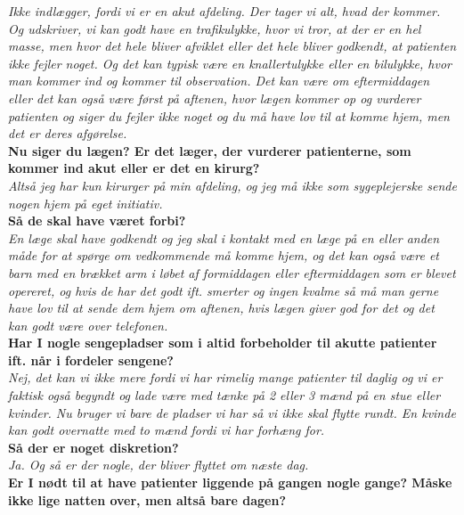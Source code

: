 \noindent
\textit{Ikke indlægger, fordi vi er en akut afdeling. Der tager vi alt, hvad der kommer. Og udskriver, vi kan godt have en trafikulykke, hvor vi tror, at der er en hel masse, men hvor det hele bliver afviklet eller det hele bliver godkendt, at patienten ikke fejler noget. Og det kan typisk være en knallertulykke eller en bilulykke, hvor man kommer ind og kommer til observation. Det kan være om eftermiddagen eller det kan også være først på aftenen, hvor lægen kommer op og vurderer patienten og siger du fejler ikke noget og du må have lov til at komme hjem, men det er deres afgørelse.}\\
\noindent
\textbf{Nu siger du lægen? Er det læger, der vurderer patienterne, som kommer ind akut eller er det en kirurg?}\\
\noindent
\textit{Altså jeg har kun kirurger på min afdeling, og jeg må ikke som sygeplejerske sende nogen hjem på eget initiativ.}\\
\noindent
\textbf{Så de skal have været forbi?}\\
\noindent
\textit{En læge skal have godkendt og jeg skal i kontakt med en læge på en eller anden måde for at spørge om vedkommende må komme hjem, og det kan også være et barn med en brækket arm i løbet af formiddagen eller eftermiddagen som er blevet opereret, og hvis de har det godt ift. smerter og ingen kvalme så må man gerne have lov til at sende dem hjem om aftenen, hvis lægen giver god for det og det kan godt være over telefonen.}\\
\noindent
\textbf{Har I nogle sengepladser som i altid forbeholder til akutte patienter ift. når i fordeler sengene?}\\
\noindent
\textit{ Nej, det kan vi ikke mere fordi vi har rimelig mange patienter til daglig og vi er faktisk også begyndt og lade være med tænke på 2 eller 3 mænd på en stue eller kvinder. Nu bruger vi bare de pladser vi har så vi ikke skal flytte rundt. En kvinde kan godt overnatte med to mænd fordi vi har forhæng for.}\\
\noindent
\textbf{Så der er noget diskretion?}\\
\noindent
\textit{Ja. Og så er der nogle, der bliver flyttet om næste dag.}\\
\noindent
\textbf{Er I nødt til at have patienter liggende på gangen nogle gange? Måske ikke lige natten over, men altså bare dagen?}\\
\noindent
